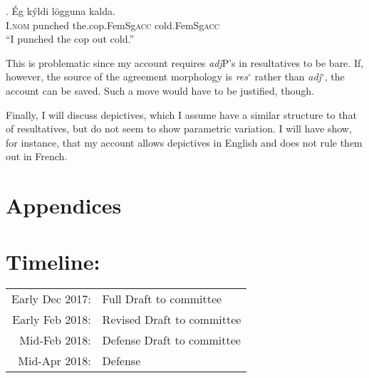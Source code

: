 \documentclass[letterpaper,12pt]{article}
\begin{document}
\exg. \'Eg k\'yldi l\"ogguna kalda. {\parencite[Icelandic][]{whelpton2007building}}\\
I.\textsc{nom} punched the.cop.FemSg\textsc{acc} cold.FemSg\textsc{acc} { }\\
``I punched the cop out cold.''

This is problematic since my account requires \textit{adj}P's in resultatives to be bare.
If, however, the source of the agreement morphology is \textit{res}$^\circ$ rather than \textit{adj}$^\circ$, the account can be saved.
Such a move would have to be justified, though.

Finally, I will discuss depictives, which I assume have a similar structure to that of resultatives, but do not seem to show parametric variation.
I will have show, for instance, that my account allows depictives in English and does not rule them out in French.

\section{Appendices}
\begin{refsection}
  \nocite{milway2015generals,milway2013forum,milway2016dogdays}
  \printbibliography[heading=none]
\end{refsection}
\section{Timeline:}
\begin{tabular}[t]{rl}
  Early Dec 2017: & Full Draft to committee \\
  Early Feb 2018: & Revised Draft to committee \\
  Mid-Feb 2018: & Defense Draft to committee \\
  Mid-Apr 2018: & Defense \\
\end{tabular}
\nocite{napoli1992secondary}
\printbibliography
\end{document}
